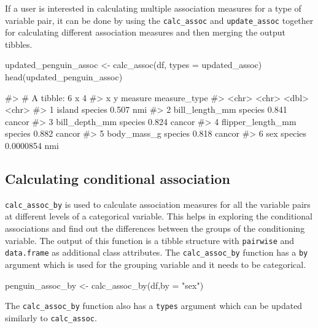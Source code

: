 If a user is interested in calculating multiple association measures for
a type of variable pair, it can be done by using the
\texttt{calc\_assoc} and \texttt{update\_assoc} together for calculating
different association measures and then merging the output tibbles.

\begin{Schunk}
\begin{Sinput}
updated_penguin_assoc <- calc_assoc(df, types = updated_assoc)
head(updated_penguin_assoc)
\end{Sinput}
\begin{Soutput}
#> # A tibble: 6 x 4
#>   x                 y         measure measure_type
#>   <chr>             <chr>       <dbl> <chr>       
#> 1 island            species 0.507     nmi         
#> 2 bill_length_mm    species 0.841     cancor      
#> 3 bill_depth_mm     species 0.824     cancor      
#> 4 flipper_length_mm species 0.882     cancor      
#> 5 body_mass_g       species 0.818     cancor      
#> 6 sex               species 0.0000854 nmi
\end{Soutput}
\end{Schunk}

\hypertarget{calculating-conditional-association}{%
\subsection{Calculating conditional
association}\label{calculating-conditional-association}}

\texttt{calc\_assoc\_by} is used to calculate association measures for
all the variable pairs at different levels of a categorical variable.
This helps in exploring the conditional associations and find out the
differences between the groups of the conditioning variable. The output
of this function is a tibble structure with \texttt{pairwise} and
\texttt{data.frame} as additional class attributes. The
\texttt{calc\_assoc\_by} function has a \texttt{by} argument which is
used for the grouping variable and it needs to be categorical.

\begin{Schunk}
\begin{Sinput}
penguin_assoc_by <- calc_assoc_by(df,by = "sex")
\end{Sinput}
\end{Schunk}

The \texttt{calc\_assoc\_by} function also has a \texttt{types} argument
which can be updated similarly to \texttt{calc\_assoc}.

